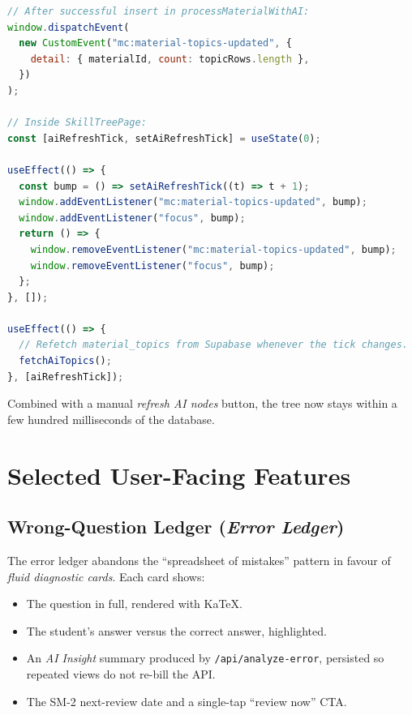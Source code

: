 \documentclass[11pt,a4paper]{article}
\newcommand{\code}[1]{\texttt{\small #1}}
\newcommand{\file}[1]{\textcolor{mcslate}{\texttt{\small #1}}}
\begin{document}
\begin{lstlisting}[language=JavaScript,caption={Event-driven refresh, simplified from \file{src/App.js}.}]
// After successful insert in processMaterialWithAI:
window.dispatchEvent(
  new CustomEvent("mc:material-topics-updated", {
    detail: { materialId, count: topicRows.length },
  })
);

// Inside SkillTreePage:
const [aiRefreshTick, setAiRefreshTick] = useState(0);

useEffect(() => {
  const bump = () => setAiRefreshTick((t) => t + 1);
  window.addEventListener("mc:material-topics-updated", bump);
  window.addEventListener("focus", bump);
  return () => {
    window.removeEventListener("mc:material-topics-updated", bump);
    window.removeEventListener("focus", bump);
  };
}, []);

useEffect(() => {
  // Refetch material_topics from Supabase whenever the tick changes.
  fetchAiTopics();
}, [aiRefreshTick]);
\end{lstlisting}

Combined with a manual \emph{refresh AI nodes} button, the tree now stays within a few hundred milliseconds of the database.

\section{Selected User-Facing Features}
\label{sec:features}

\subsection{Wrong-Question Ledger (\emph{Error Ledger})}

The error ledger abandons the ``spreadsheet of mistakes'' pattern in favour of \emph{fluid diagnostic cards}. Each card shows:

\begin{itemize}
    \item The question in full, rendered with KaTeX.
    \item The student's answer versus the correct answer, highlighted.
    \item An \emph{AI Insight} summary produced by \code{/api/analyze-error}, persisted so repeated views do not re-bill the API.
    \item The SM-2 next-review date and a single-tap ``review now'' CTA.
\end{itemize}
\end{document}
